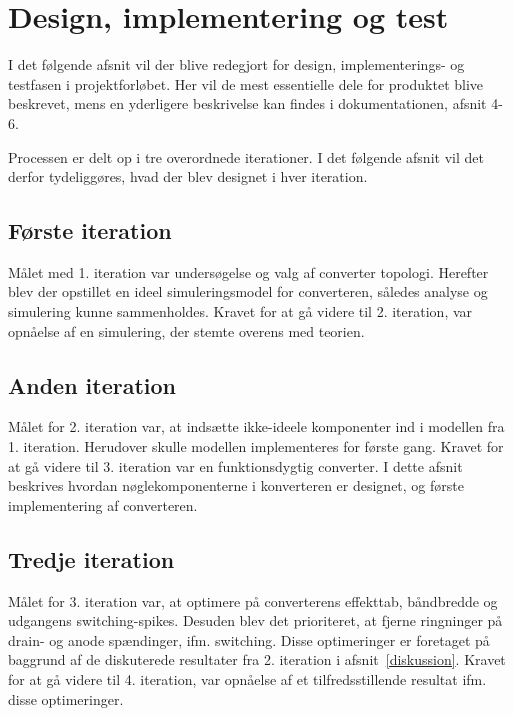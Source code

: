 \chapter{Design, implementering og test}
I det følgende afsnit vil der blive redegjort for design, implementerings- og testfasen i projektforløbet. Her vil de mest essentielle dele for produktet blive beskrevet, mens en yderligere beskrivelse kan findes i dokumentationen, afsnit 4-6.

Processen er delt op i tre overordnede iterationer. I det følgende afsnit vil det derfor tydeliggøres, hvad der blev designet i hver iteration. 


\section{Første iteration}
Målet med 1. iteration var undersøgelse og valg af converter topologi. Herefter blev der opstillet en ideel simuleringsmodel for converteren, således analyse og simulering kunne sammenholdes. 
Kravet for at gå videre til 2. iteration, var opnåelse af en simulering, der stemte overens med teorien. 






\section{Anden iteration}
Målet for 2. iteration var, at indsætte ikke-ideele komponenter ind i modellen fra 1. iteration. Herudover skulle modellen implementeres for første gang. 
Kravet for at gå videre til 3. iteration var en funktionsdygtig converter. 
I dette afsnit beskrives hvordan nøglekomponenterne i konverteren er designet, og første implementering af converteren.














\clearpage

\section{Tredje iteration}
Målet for 3. iteration var, at optimere på converterens effekttab, båndbredde og udgangens switching-spikes. Desuden blev det prioriteret, at fjerne ringninger på drain- og anode spændinger, ifm. switching. Disse optimeringer er foretaget på baggrund af de diskuterede resultater fra 2. iteration i afsnit~\ref{diskussion}.
Kravet for at gå videre til 4. iteration, var opnåelse af et tilfredsstillende resultat ifm. disse optimeringer.

